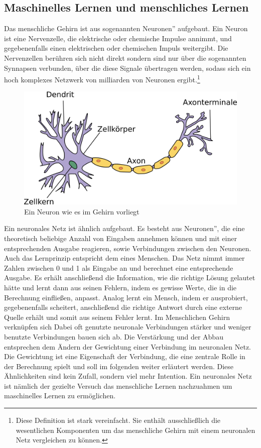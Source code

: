 \documentclass{article}
\begin{document}
\subsection{Maschinelles Lernen und menschliches Lernen}
Das menschliche Gehirn ist aus sogenannten \glqq Neuronen'' aufgebaut. Ein Neuron ist eine Nervenzelle, die elektrische oder chemische Impulse annimmt, und gegebenenfalls einen elektrischen oder chemischen Impuls weitergibt. Die Nervenzellen berühren sich nicht direkt sondern sind nur über die sogenannten Synnapsen verbunden, über die diese Signale übertragen werden, sodass sich ein hoch komplexes Netzwerk von milliarden von Neuronen ergibt.\footnote{
Diese Definition ist stark vereinfacht. Sie enthält ausschließlich die wesentlichen Komponenten um das menschliche Gehirn mit einem neuronalen Netz vergleichen zu können.}
\begin{figure}[h]
	\centering
	\includegraphics[]{../graphics/Neuron.png}
	\caption[Neuron \newline 
	Quelle: simple.wikipedia.org/wiki/File:Neuron.svg\newline
	Copyright: CC Attribution-Share Alike von Nutzer Dhp1080,\newline
 	bearbeitet]{Ein Neuron wie es im Gehirn vorliegt}
\end{figure}
Ein neuronales Netz ist ähnlich aufgebaut. Es besteht aus \glqq Neuronen'', die eine theoretisch beliebige Anzahl von Eingaben annehmen können und mit einer entsprechenden Ausgabe reagieren, sowie Verbindungen zwischen den Neuronen. Auch das Lernprinzip entspricht dem eines Menschen. Das Netz nimmt immer Zahlen zwischen 0 und 1 als Eingabe an und berechnet eine entsprechende Ausgabe. Es erhält anschließend die Information, wie die richtige Lösung gelautet hätte und lernt dann aus seinen Fehlern, indem es gewisse Werte, die in die Berechnung einfließen, anpasst. Analog lernt ein Mensch, indem er ausprobiert, gegebenenfalls scheitert, anschließend die richtige Antwort durch eine externe Quelle erhält und somit aus seinem Fehler lernt. Im Menschlichen Gehirn verknüpfen sich Dabei oft genutzte neuronale Verbindungen stärker und weniger benutzte Verbindungen bauen sich ab\cite{2}. Die Verstärkung und der Abbau entsprechen dem Ändern der Gewichtung einer Verbindung im neuronalen Netz. Die Gewichtung ist eine Eigenschaft der Verbindung, die eine zentrale Rolle in der Berechnung spielt und soll im folgenden weiter erläutert werden. Diese Ähnlichkeiten sind kein Zufall, sondern viel mehr Intention. Ein neuronales Netz ist nämlich der gezielte Versuch das menschliche Lernen nachzuahmen um maschinelles Lernen zu ermöglichen.
\end{document}
